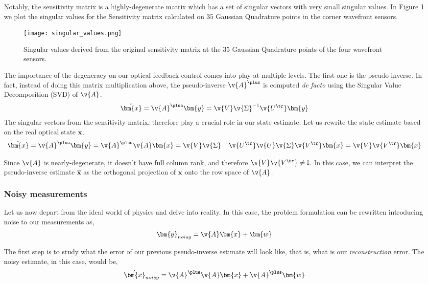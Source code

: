 \documentclass[SE,authoryear,toc]{lsstdoc}
\begin{document}
Notably, the sensitivity matrix is a highly-degenerate matrix which has a set of singular vectors with very small singular values. In Figure \ref{fig1} we plot the singular values for the Sensitivity matrix calculated on 35 Gaussian Quadrature points in the corner wavefront sensors. 

\begin{figure}[h!]
    \centering
    \texttt{[image: singular\_values.png]}
    \caption{Singular values derived from the original sensitivity matrix at the 35 Gaussian Quadrature points of the four wavefront sensors.}
    \label{fig1}
\end{figure}

The importance of the degeneracy on our optical feedback control comes into play at multiple levels. The first one is the pseudo-inverse. In fact, instead of doing this matrix multiplication above, the pseudo-inverse $\v{A}^{\plus}$ is computed \textit{de facto} using the Singular Value Decomposition (SVD) of $\v{A}$.
\begin{equation}
     \hat{\bm{x}} = \v{A}^{\plus}\bm{y} = \v{V} \v{\Sigma}^{-1} \v{U^{\tr}}\bm{y}
\end{equation}
The singular vectors from the sensitivity matrix, therefore play a crucial role in our state estimate. Let us rewrite the state estimate based on the real optical state $\bm{x}$,
\begin{equation}
     \hat{\bm{x}} = \v{A}^{\plus}\bm{y} = \v{A}^{\plus}\v{A}\bm{x} = \v{V}\v{\Sigma}^{-1} \v{U^{\tr}}\v{U} \v{\Sigma} \v{V^{\tr}}\bm{x} =  \v{V}\v{V^{\tr}}\bm{x}
\end{equation}

Since $\v{A}$ is nearly-degenerate, it doesn't have full column rank, and therefore $\v{V}\v{V^{\tr}} \neq \mathbb{I}$. In this case, we can interpret the pseudo-inverse estimate $\hat{\bm{x}}$ as the orthogonal projection of $\bm{x}$ onto the row space of $\v{A}$. 


\subsubsection*{Noisy measurements}
Let us now depart from the ideal world of physics and delve into reality. In this case, the problem formulation can be rewritten introducing noise to our measurements as,
\begin{equation}
    \bm{y}_{noisy} = \v{A} \bm{x} + \bm{w}
\end{equation}

The first step is to study what the error of our previous pseudo-inverse estimate will look like, that is, what is our \textit{reconstruction} error. The noisy estimate, in this case, would be, 
\begin{equation}
    \hat{\bm{x}}_{noisy} = \v{A}^{\plus}\v{A}\bm{x} +\v{A}^{\plus}\bm{w} 
\end{equation}
\end{document}
